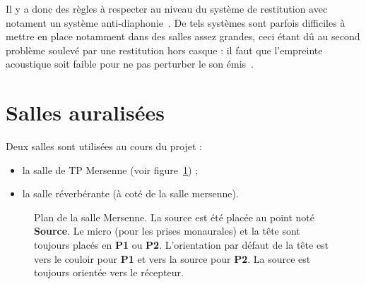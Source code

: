 Il y a donc des règles à respecter au niveau du système de restitution avec notament un système
anti-diaphonie~\cite{Kle93}. De tels systèmes sont parfois difficiles à mettre en place notamment dans des salles assez
grandes, ceci étant dû au second problème soulevé par une restitution hors casque : il faut que l'empreinte acoustique
soit faible pour ne pas perturber le son émis~\cite{Bru10}.


\newpage %

\section{Salles auralisées} %

Deux salles sont utilisées au cours du projet :

\begin{itemize}
    \item la salle de TP Mersenne (voir figure~\ref{plan_mersenne}) ;
    \item la salle réverbérante (à coté de la salle mersenne).
\end{itemize}

\begin{figure}[h!]
    \caption{\label{plan_mersenne}Plan de la salle Mersenne. La source est été placée au point noté
    \textbf{Source}. Le micro (pour les prises monaurales) et la tête sont toujours placés en \textbf{P1} ou
    \textbf{P2}. L'orientation par défaut de la tête est vers le couloir pour \textbf{P1} et vers la source pour
    \textbf{P2}. La source est toujours orientée vers le récepteur.}
\end{figure}
